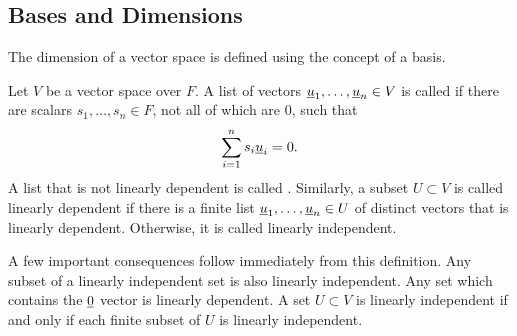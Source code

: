 \subsection{Bases and Dimensions}
\label{section:BasesAndDimensions}

The dimension of a vector space is defined using the concept of a basis.

\begin{definition}
Let $V$ be a vector space over $F$.
A list of vectors $\underline{u}_1, \ldots, \underline{u}_n \in V $ is called  if there are scalars $s_1, \ldots, s_n \in F$, not all of which are $0$, such that
\begin{equation*}
\sum_{i=1}^n s_i \underline{u}_i = 0.
\end{equation*}
A list that is not linearly dependent is called .
Similarly, a subset $U \subset V$ is called linearly dependent if there is a finite list $\underline{u}_1, \ldots, \underline{u}_n \in U$ of distinct vectors that is linearly dependent.
Otherwise, it is called linearly independent.
\end{definition}

A few important consequences follow immediately from this definition.
Any subset of a linearly independent set is also linearly independent.
Any set which contains the $\underline{0}$ vector is linearly dependent.
A set $U \subset V$ is linearly independent if and only if each finite subset of $U$ is linearly independent.

\iffalse

